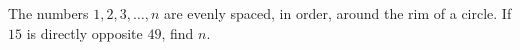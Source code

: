The numbers $1,2,3,\dots,n$ are evenly spaced, in order, around the rim of a circle. If $15$ is directly opposite $49$, find $n$.
